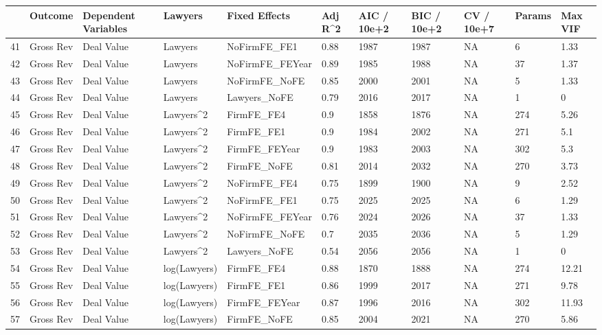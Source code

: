 \documentclass{article}
\begin{document}
\begin{table}[H]
\centering
\begin{tabular}{rllllllllll}
  \hline
 & Outcome & Dependent Variables & Lawyers & Fixed Effects & Adj R^2 & AIC / 10e+2 & BIC / 10e+2 & CV / 10e+7 & Params & Max VIF \\ 
  \hline
41 & Gross Rev & Deal Value & Lawyers & NoFirmFE\_FE1 & 0.88 & 1987 & 1987 & NA & 6 & 1.33 \\ 
  42 & Gross Rev & Deal Value & Lawyers & NoFirmFE\_FEYear & 0.89 & 1985 & 1988 & NA & 37 & 1.37 \\ 
  43 & Gross Rev & Deal Value & Lawyers & NoFirmFE\_NoFE & 0.85 & 2000 & 2001 & NA & 5 & 1.33 \\ 
  44 & Gross Rev & Deal Value & Lawyers & Lawyers\_NoFE & 0.79 & 2016 & 2017 & NA & 1 & 0 \\ 
  45 & Gross Rev & Deal Value & Lawyers^2 & FirmFE\_FE4 & 0.9 & 1858 & 1876 & NA & 274 & 5.26 \\ 
  46 & Gross Rev & Deal Value & Lawyers^2 & FirmFE\_FE1 & 0.9 & 1984 & 2002 & NA & 271 & 5.1 \\ 
  47 & Gross Rev & Deal Value & Lawyers^2 & FirmFE\_FEYear & 0.9 & 1983 & 2003 & NA & 302 & 5.3 \\ 
  48 & Gross Rev & Deal Value & Lawyers^2 & FirmFE\_NoFE & 0.81 & 2014 & 2032 & NA & 270 & 3.73 \\ 
  49 & Gross Rev & Deal Value & Lawyers^2 & NoFirmFE\_FE4 & 0.75 & 1899 & 1900 & NA & 9 & 2.52 \\ 
  50 & Gross Rev & Deal Value & Lawyers^2 & NoFirmFE\_FE1 & 0.75 & 2025 & 2025 & NA & 6 & 1.29 \\ 
  51 & Gross Rev & Deal Value & Lawyers^2 & NoFirmFE\_FEYear & 0.76 & 2024 & 2026 & NA & 37 & 1.33 \\ 
  52 & Gross Rev & Deal Value & Lawyers^2 & NoFirmFE\_NoFE & 0.7 & 2035 & 2036 & NA & 5 & 1.29 \\ 
  53 & Gross Rev & Deal Value & Lawyers^2 & Lawyers\_NoFE & 0.54 & 2056 & 2056 & NA & 1 & 0 \\ 
  54 & Gross Rev & Deal Value & log(Lawyers) & FirmFE\_FE4 & 0.88 & 1870 & 1888 & NA & 274 & 12.21 \\ 
  55 & Gross Rev & Deal Value & log(Lawyers) & FirmFE\_FE1 & 0.86 & 1999 & 2017 & NA & 271 & 9.78 \\ 
  56 & Gross Rev & Deal Value & log(Lawyers) & FirmFE\_FEYear & 0.87 & 1996 & 2016 & NA & 302 & 11.93 \\ 
  57 & Gross Rev & Deal Value & log(Lawyers) & FirmFE\_NoFE & 0.85 & 2004 & 2021 & NA & 270 & 5.86 \\ 

\end{tabular}
\end{table}
\end{document}
